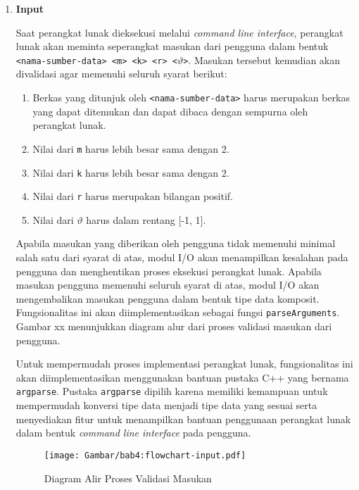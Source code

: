 \begin{enumerate}
    \item \textbf{Input}
    
    Saat perangkat lunak dieksekusi melalui \textit{command line interface}, perangkat lunak akan meminta seperangkat masukan dari pengguna dalam bentuk \texttt{<nama-sumber-data> <m> <k> <r> <$\vartheta$>}. Masukan tersebut kemudian akan divalidasi agar memenuhi seluruh syarat berikut:
    
    \begin{enumerate}
        \item Berkas yang ditunjuk oleh \texttt{<nama-sumber-data>} harus merupakan berkas yang dapat ditemukan dan dapat dibaca dengan sempurna oleh perangkat lunak.
        \item Nilai dari \texttt{m} harus lebih besar sama dengan 2.
        \item Nilai dari \texttt{k} harus lebih besar sama dengan 2.
        \item Nilai dari \texttt{r} harus merupakan bilangan positif.
        \item Nilai dari $\vartheta$ harus dalam rentang [-1, 1].
    \end{enumerate}
    
    Apabila masukan yang diberikan oleh pengguna tidak memenuhi minimal salah satu dari syarat di atas, modul I/O akan menampilkan kesalahan pada pengguna dan menghentikan proses eksekusi perangkat lunak. Apabila masukan pengguna memenuhi seluruh syarat di atas, modul I/O akan mengembalikan masukan pengguna dalam bentuk tipe data komposit. Fungsionalitas ini akan diimplementasikan sebagai fungsi \texttt{parseArguments}. Gambar xx menunjukkan diagram alur dari proses validasi masukan dari pengguna.
    
    Untuk mempermudah proses implementasi perangkat lunak, fungsionalitas ini akan diimplementasikan menggunakan bantuan pustaka C++ yang bernama \texttt{argparse}. Pustaka \texttt{argparse} dipilih karena memiliki kemampuan untuk mempermudah konversi tipe data menjadi tipe data yang sesuai serta menyediakan fitur untuk menampilkan bantuan penggunaan perangkat lunak dalam bentuk \textit{command line interface} pada pengguna.
    
    \iffalse
    
    \begin{figure}[t]
        \centering
        \texttt{[image: Gambar/bab4:flowchart-input.pdf]}
        \caption{Diagram Alir Proses Validasi Masukan}
        \label{bab4:flowchart-input}
    \end{figure}
    

\end{enumerate}

